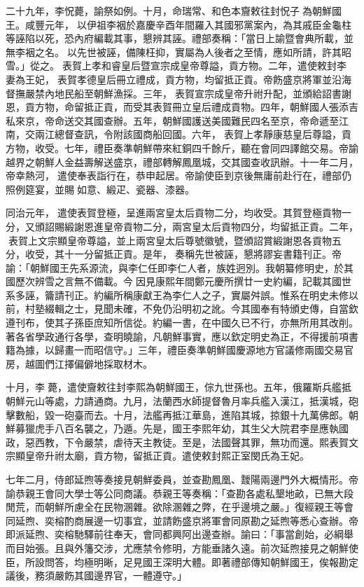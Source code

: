 \begin{pinyinscope}
二十九年，李怳薨，諭祭如例。十月，命瑞常、和色本齎敕往封怳子為朝鮮國王。咸豐元年，以伊祖李裀於嘉慶辛酉年間羅入其國邪黨案內，為其戚臣金龜柱等誣陷以死，恐內府編載其事，懇辨其誣。禮部奏稱：「當日上諭暨會典所載，並無李裀之名。以先世被誣，備陳枉抑，實屬為人後者之至情，應如所請，許其昭雪。」從之。表賀上孝和睿皇后暨宣宗成皇帝尊謚，貢方物。二年，遣使敕封李妻為王妃，表賀孝德皇后冊立禮成，貢方物，均留抵正貢。帝飭盛京將軍並沿海督撫嚴禁內地民船至朝鮮漁採。三年，表賀宣宗成皇帝升祔升配，並頒給詔書謝恩，貢方物，命留抵正貢，而受其表賀冊立皇后禮成貢物。四年，朝鮮國人張添吉私來京，帝命送交其國查辦。五年，朝鮮國護送美國難民四名至京，帝命遞至江南，交兩江總督查訊，令附該國商船回國。六年，表賀上孝靜康慈皇后尊謚，貢方物，收受。七年，禮臣奏準朝鮮帶來紅銅四千餘斤，聽在會同四譯館交易。帝諭越界之朝鮮人金益壽解送盛京，禮部轉解鳳凰城，交其國查收訊辦。十一年二月，帝幸熱河，遣使奉表詣行在，恭申起居。帝諭使臣到京後無庸前赴行在，禮部仍照例筵宴，並賜如意、緞疋、瓷器、漆器。

同治元年，遣使表賀登極，呈進兩宮皇太后貢物二分，均收受。其賀登極貢物一分，又頒詔賜緞謝恩進皇帝貢物二分，兩宮皇太后貢物四分，均留抵正貢。二年，表賀上文宗顯皇帝尊謚，並上兩宮皇太后尊號徽號，暨頒詔賞緞謝恩各貢物五分，收受，其十一分留抵正貢。是年，奏稱先世被誣，懇將謬妄書籍刊正。帝諭：「朝鮮國王先系源流，與李仁任即李仁人者，族姓迥別。我朝纂修明史，於其國歷次辨雪之言無不備載。今因見康熙年間鄭元慶所撰廿一史約編，記載其國世系多誣，籥請刊正。約編所稱康獻王為李仁人之子，實屬舛誤。惟系在明史未修以前，村塾綴輯之士，見聞未確，不免仍沿明初之訛。今其國奉有特頒史傳，自當欽遵刊布，使其子孫臣庶知所信從。約編一書，在中國久已不行，亦無所用其改削。著各省學政通行各學，查明曉諭，凡朝鮮事實，應以欽定明史為正，不得援前項書籍為據，以歸畫一而昭信守。」三年，禮臣奏準朝鮮國慶源地方官議修兩國交易官房，越圖們江擇偏僻地採取材木。

十月，李薨，遣使齎敕往封李熙為朝鮮國王，倧九世孫也。五年，俄羅斯兵艦抵朝鮮元山等處，力請通商。九月，法蘭西水師提督魯月率兵艦入漢江，抵漢城，砲擊數船，毀一砲臺而去。十月，法艦再抵江華島，進陷其城，掠銀十九萬佛郎。朝鮮募獵虎手八百名襲之，乃遁。先是，國王李熙年幼，其生父大院君李昰應執國政，惡西教，下令嚴禁，虐待天主教徒。至是，法國聲其罪，無功而還。熙表賀文宗顯皇帝升祔太廟，貢方物，留抵正貢。遣使敕封熙正室閔氏為王妃。

七年二月，侍郎延煦等奏接見朝鮮委員，並查勘鳳凰、靉陽兩邊門外大概情形。帝諭恭親王會同大學士等公同商議。恭親王等奏稱：「查勘各處私墾地畝，已無大段閒荒，而朝鮮所慮全在民物溷雜。欲除溷雜之弊，在乎邊境之嚴。」復經親王等會同延煦、奕榕酌商展邊一切事宜，並請飭盛京將軍會同原勘之延煦等悉心查辦。帝即派延煦、奕榕馳驛前往奉天，會同都興阿出邊查辦。諭曰：「事當創始，必綱舉而目始張。且與外籓交涉，尤應禁令修明，方能垂諸久遠。前次延煦接見之朝鮮使臣，所設問答，均極明晰，足見國王深明大體。即著禮部傳知朝鮮國王，俟報勘定議後，務須嚴飭其國邊界官，一體遵守。」


\end{pinyinscope}
